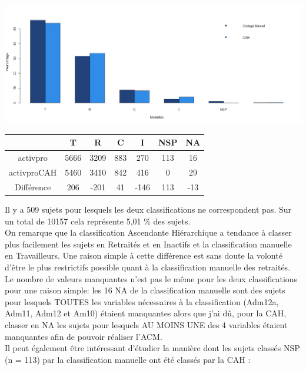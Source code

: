 \documentclass{book}
\begin{document}
\includegraphics[scale=.4]{comp_codages_activpro_pourcentage.png}

\begin{center}
\setlength\arrayrulewidth{.5pt}
\begin{tabular}{c|cccccc}

	& T & R & C & I & NSP & NA \\
	\hline
activpro & 5666 & 3209 & 883 & 270 & 113 & 16 \\
activproCAH	 & 5460 & 3410 &  842 & 416 & 0 & 29 \\
\hline
\hline
Différence & 206 & -201 &  41 & -146& 113& -13
\end{tabular}
\end{center}

\noindent
Il y a 509 sujets pour lesquels les deux classifications ne correspondent pas. Sur un total de 10157 cela représente 5,01 \% des sujets.\\
On remarque que la classification Ascendante Hiérarchique a tendance à classer plus facilement les sujets en Retraités et en Inactifs et la classification manuelle en Travailleurs. Une raison simple à cette différence est sans doute la volonté d'être le plus restrictifs possible quant à la classification manuelle des retraités.\\

\noindent
Le nombre de valeurs manquantes n'est pas le même pour les deux classifications pour une raison simple: les 16 NA de la classification manuelle sont des sujets pour lesquels TOUTES les variables nécessaires à la classification (Adm12a, Adm11, Adm12 et Am10) étaient manquantes alors que j'ai dû, pour la CAH, classer en NA les sujets pour lesquels AU MOINS UNE des 4 variables étaient manquantes afin de pouvoir réaliser l'ACM.\\

\noindent
Il peut également être intéressant d'étudier la manière dont les sujets classés NSP (n = 113) par la classification manuelle ont été classés par la CAH :\\
\end{document}
